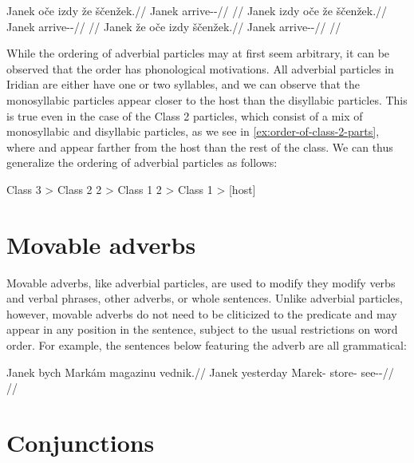 \pex
\a\label{ex:oce-iz-gramm}
\begingl
	\gla Janek oče izdy že ščenžek.//
	\glb Janek \Mir{} \Infer{} \Pfv{} arrive-\Av{}-\Pf{}//
	\glft {}//
\endgl
\a\label{ex:iz-oce-gramm}
\begingl
	\gla Janek izdy oče že ščenžek.//
	\glb Janek \Infer{} \Mir{} \Pfv{} arrive-\Av{}-\Pf{}//
	\glft {}//
\endgl
\a\label{ex:oce-iz-ungramm}
\begingl
	\gla \ljudge{*}Janek že oče izdy ščenžek.//
	\glb Janek \Pfv{} \Mir{} \Infer{} arrive-\Av{}-\Pf{}//
	\glft {}//
\endgl
\xe

While the ordering of adverbial particles may at first seem arbitrary, it can be
observed that the order has phonological motivations. All adverbial particles in
Iridian are either have one or two syllables, and we can observe that the
monosyllabic particles appear closer to the host than the disyllabic particles.
This is true even in the case of the Class 2 particles, which consist of a mix
of monosyllabic and disyllabic particles, as we see in
\ref{ex:order-of-class-2-parts}, where  and  appear farther
from the host than the rest of the class. We can thus generalize the ordering of
adverbial particles as follows:

\pex
	{\small
		Class 3 > Class 2 2\sigma{} > Class 1 2\sigma{} > Class 1 > [{\sc host}]
	}
\xe

\section{Movable adverbs}
\label{sec:movable-adverbs}

Movable adverbs, like adverbial particles, are used to modify they modify verbs
and verbal phrases, other adverbs, or whole sentences. Unlike adverbial
particles, however, movable adverbs do not need to be cliticized to the
predicate and may appear in any position in the sentence, subject to the usual
restrictions on word order. For example, the sentences below featuring the
adverb  are all grammatical:

\pex
\a
	\begingl
	\gla Janek bych Markám magazinu vednik.//
	\glb Janek yesterday Marek-\Agt{} store-\Ins{} see-\Pv{}-\Pf{}//
	\glft {}//
	\endgl
\a {}
\a {}
\a {}
\xe



\section{Conjunctions}
\label{sec:conj}

